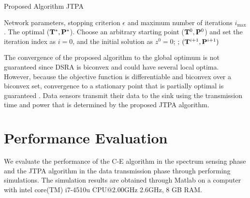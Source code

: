 \documentclass[journal]{IEEEtran} \ifCLASSINFOpdf
\begin{document}
\begin{algorithm}[h]
\caption{Proposed Algorithm JTPA}
\label{alg_acs}
\begin{algorithmic}[1]
\REQUIRE Network parameters, stopping criterion $\epsilon$ and maximum number of  iterations $i_{\max}$.
\ENSURE The optimal (${\bf T}^*, {\bf P}^*$).
\STATE Choose an arbitrary starting point (${\bf T}^0, {\bf P}^0$) and set the iteration index as $i = 0$, and the initial solution as $z^0 = 0$;
\REPEAT {}
;
\RETURN $({\bf T}^{i+1}, {\bf P}^{i+1})$
\end{algorithmic}
\end{algorithm}

The convergence of the proposed algorithm to the global optimum is not guaranteed since DSRA is biconvex and could have several local optima. However, because the objective function is differentiable and biconvex over a biconvex set, convergence to a stationary point that is partially optimal is guaranteed \cite{Gorski2007}. Data sensors transmit their data to the sink using the transmission time and power that is determined by the proposed JTPA algorithm.
\section{Performance Evaluation} \label{sec:evaluation}
We evaluate the performance of the C-E algorithm in the spectrum sensing phase and the JTPA algorithm in the data transmission phase through performing simulations. The simulation results are obtained through Matlab on a computer with intel core(TM) i7-4510u CPU@2.00GHz 2.6GHz, 8 GB RAM.
\end{document}
